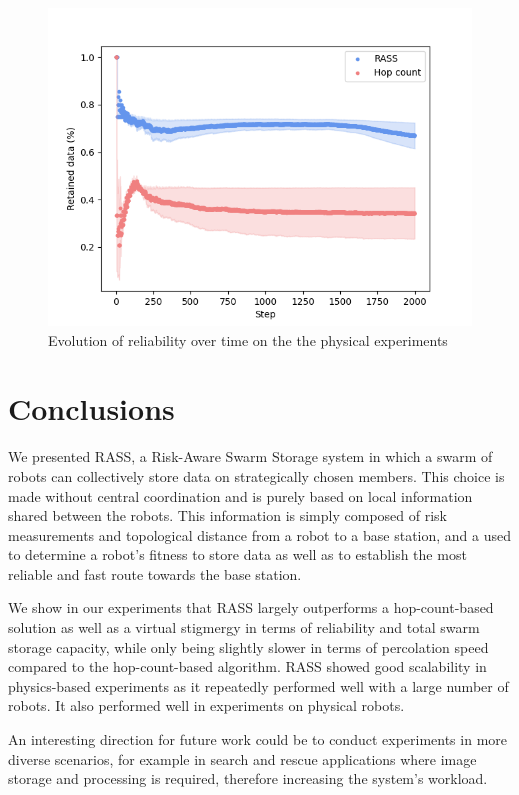 \documentclass[sigconf]{aamas}
\begin{document}
\begin{figure}[h]
	\centering
    \includegraphics[width=0.95\columnwidth]{figures/reliability.png}
    \caption{Evolution of reliability over time on the the physical experiments}
    \label{results:physicalRelaibility}
\vspace{-2mm}
\end{figure}

\section{Conclusions}
\label{conclusion}

We presented RASS, a Risk-Aware Swarm Storage system in which a swarm of robots can collectively store data on strategically chosen members. This choice is made without central coordination and is purely based on local information shared between the robots. This information is simply composed of risk measurements and topological distance from a robot to a base station, and a used to determine a robot's fitness to store data as well as to establish the most reliable and fast route towards the base station.

We show in our experiments that RASS largely outperforms a hop-count-based solution as well as a virtual stigmergy in terms of reliability and total swarm storage capacity, while only being slightly slower in terms of percolation speed compared to the hop-count-based algorithm. RASS showed good scalability in physics-based experiments as it repeatedly performed well with a large number of robots. It also performed well in experiments on physical robots.

An interesting direction for future work could be to conduct experiments in more diverse scenarios, for example in search and rescue applications where image storage and processing is required, therefore increasing the system's workload.



\end{document}
